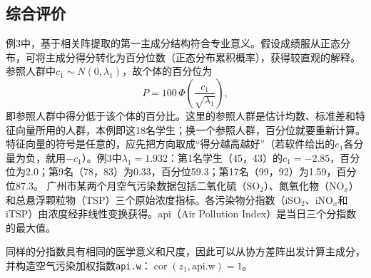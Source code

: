 \subsection{综合评价}
例3中，基于相关阵提取的第一主成分结构符合专业意义。假设成绩服从正态分布，可将主成分得分转化为百分位数（正态分布累积概率），获得较直观的解释。参照人群中$c_1\sim N(0,\lambda_1)$，故个体的百分位为
\[
P=100\,\Phi\!\left(\frac{c_1}{\sqrt{\lambda_1}}\right),
\]
即参照人群中得分低于该个体的百分比。这里的参照人群是估计均数、标准差和特征向量所用的人群，本例即这18名学生；换一个参照人群，百分位就要重新计算。特征向量的符号是任意的，应先把方向取成“得分越高越好”（若软件给出的$e_1$各分量为负，就用$-c_1$）。例3中$\lambda_1=1.932$：第1名学生（45，43）的$c_1=-2.85$，百分位为2.0；第9名（78，83）为0.33，百分位59.3；第17名（99，92）为1.59，百分位87.3。
广州市某两个月空气污染数据包括二氧化硫（SO$_2$）、氮氧化物（NO$_x$）和总悬浮颗粒物（TSP）三个原始浓度指标。各污染物分指数（iSO$_2$、iNO$_x$和iTSP）由浓度经非线性变换获得。api（Air Pollution Index）是当日三个分指数的最大值。

同样的分指数具有相同的医学意义和尺度，因此可以从协方差阵出发计算主成分，并构造空气污染加权指数\texttt{api.w}：$\operatorname{cor}(z_1,\mathrm{api.w})=1$。


